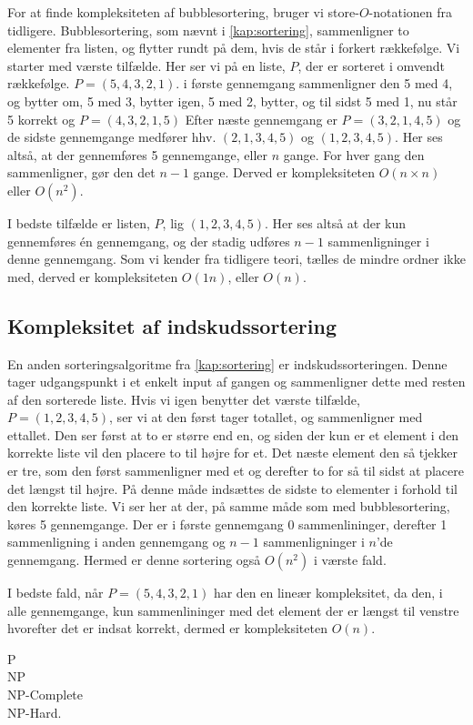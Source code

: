 For at finde kompleksiteten af bubblesortering, bruger vi store-$O$-notationen fra tidligere. 
Bubblesortering, som nævnt i \autoref{kap:sortering}, sammenligner to elementer fra listen, og flytter rundt på dem, hvis de står i forkert rækkefølge.
Vi starter med værste tilfælde. Her ser vi på en liste, $P$, der er sorteret i omvendt rækkefølge. $P = (5,4,3,2,1)$.
i første gennemgang sammenligner den 5 med 4, og bytter om, 5 med 3, bytter igen, 5 med 2, bytter, og til sidst 5 med 1, nu står 5 korrekt og $P = (4, 3, 2, 1, 5)$
Efter næste gennemgang er $P = (3, 2, 1, 4, 5)$ og de sidste gennemgange medfører hhv. $(2, 1, 3, 4, 5)$ og $(1, 2, 3, 4, 5)$. Her ses altså, at der gennemføres 5 gennemgange, eller $n$ gange. 
For hver gang den sammenligner, gør den det $n-1$ gange. 
Derved er kompleksiteten $O(n\times n)$ eller $O(n^2)$.

I bedste tilfælde er listen, $P$, lig $(1, 2, 3, 4, 5)$.
Her ses altså at der kun gennemføres én gennemgang, og der stadig udføres $n-1$ sammenligninger i denne gennemgang.
Som vi kender fra tidligere teori, tælles de mindre ordner ikke med, derved er kompleksiteten $O(1n)$, eller $O(n)$. 

\subsection{Kompleksitet af indskudssortering} \label{kap:kom_indskud}
En anden sorteringsalgoritme fra \autoref{kap:sortering} er indskudssorteringen. 
Denne tager udgangspunkt i et enkelt input af gangen og sammenligner dette med resten af den sorterede liste.
Hvis vi igen benytter det værste tilfælde, $P = (1,2,3,4,5)$, ser vi at den først tager totallet, og sammenligner med ettallet. Den ser først at to er større end en, og siden der kun er et element i den korrekte liste vil den placere to til højre for et. Det næste element den så tjekker er tre, som den først sammenligner med et og derefter to for så til sidst at placere det længst til højre. På denne måde indsættes de sidste to elementer i forhold til den korrekte liste.
Vi ser her at der, på samme måde som med bubblesortering, køres 5 gennemgange. Der er i første gennemgang 0 sammenlininger, derefter 1 sammenligning i anden gennemgang og $n-1$ sammenligninger i $n$'de gennemgang. Hermed er denne sortering også $O(n^2)$ i værste fald.

I bedste fald, når $P= (5,4,3,2,1)$ har den en lineær kompleksitet, da den, i alle gennemgange, kun sammenlininger med det element der er længst til venstre hvorefter det er indsat korrekt, dermed er kompleksiteten $O(n)$.



P \\
NP \\
NP-Complete \\
NP-Hard. 


